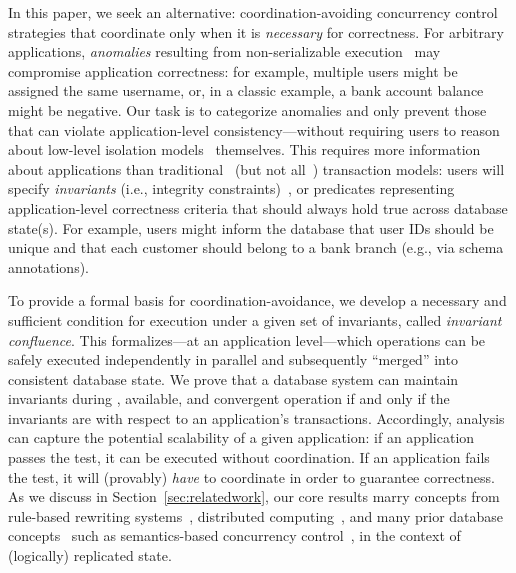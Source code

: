 
In this paper, we seek an alternative: coordination-avoiding
concurrency control strategies that coordinate only when it is
\textit{necessary} for correctness. For arbitrary applications,
\textit{anomalies} resulting from non-serializable
execution~\cite{adya-isolation} may compromise application
correctness: for example, multiple users might be assigned the same
username, or, in a classic example, a bank account balance might be
negative. Our task is to categorize anomalies and only prevent those
that can violate application-level consistency---without requiring
users to reason about low-level isolation models~\cite{hat-vldb}
themselves. This requires more information about applications than
traditional~\cite{bernstein-book,gray-virtues} (but not
all~\cite{eswaran-consistency,korth-serializability,decomp-semantics,garciamolina-semantics,activedb-book,ic-survey,ic-survey-two})
transaction models: users will specify \textit{invariants} (i.e.,
integrity constraints)~\cite{traiger-tods}, or predicates representing
application-level correctness criteria that should always hold true
across database state(s). For example, users might inform the database
that user IDs should be unique and that each customer should belong to
a bank branch (e.g., via schema annotations).

To provide a formal basis for coordination-avoidance, we develop a
necessary and sufficient condition for \cfree execution under a given
set of invariants, called \textit{invariant confluence}. This
\iconfluence formalizes---at an application level---which operations
can be safely executed independently in parallel and subsequently
``merged'' into consistent database state. We prove that a database
system can maintain invariants during \cfree, available, and
convergent operation if and only if the invariants are \iconfluent
with respect to an application's transactions. Accordingly,
\iconfluence analysis can capture the potential scalability of a given
application: if an application passes the \iconfluence test, it can be
executed without coordination. If an application fails the test, it
will (provably) \textit{have} to coordinate in order to guarantee
correctness. As we discuss in Section~\ref{sec:relatedwork}, our core
results marry concepts from rule-based rewriting
systems~\cite{obs-confluence,termrewriting}, distributed
computing~\cite{herlihy-apologizing,gilbert-cap,hat-vldb}, and many
prior database concepts~\cite{activedb-book,ic-survey,ic-survey-two}
such as semantics-based concurrency
control~\cite{sdd1,decomp-semantics,badrinath-semantics,garciamolina-semantics,korth-serializability,atomictransactions,weihl-thesis},
in the context of (logically) replicated state.

